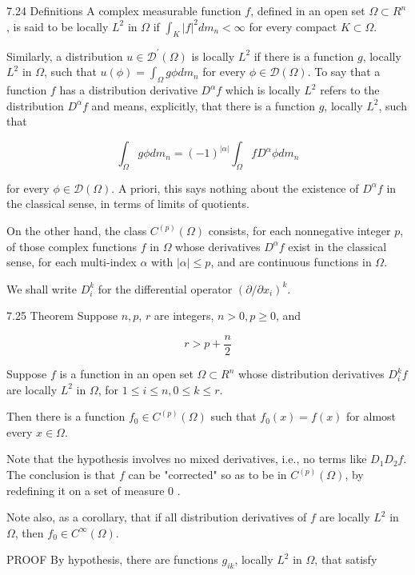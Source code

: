 \documentclass[10pt]{article}
\begin{document}
7.24 Definitions A complex measurable function $f$, defined in an open set $\Omega \subset R^{n}$, is said to be locally $L^{2}$ in $\Omega$ if $\int_{K}|f|^{2} d m_{n}<\infty$ for every compact $K \subset \Omega$.

Similarly, a distribution $u \in \mathscr{D}^{\prime}(\Omega)$ is locally $L^{2}$ if there is a function $g$, locally $L^{2}$ in $\Omega$, such that $u(\phi)=\int_{\Omega} g \phi d m_{n}$ for every $\phi \in \mathscr{D}(\Omega)$. To say that a function $f$ has a distribution derivative $D^{\alpha} f$ which is locally $L^{2}$ refers to the distribution $D^{\alpha} f$ and means, explicitly, that there is a function $g$, locally $L^{2}$, such that

$$
\int_{\Omega} g \phi d m_{n}=(-1)^{|\alpha|} \int_{\Omega} f D^{\alpha} \phi d m_{n}
$$

for every $\phi \in \mathscr{D}(\Omega)$. A priori, this says nothing about the existence of $D^{\alpha} f$ in the classical sense, in terms of limits of quotients.

On the other hand, the class $C^{(p)}(\Omega)$ consists, for each nonnegative integer $p$, of those complex functions $f$ in $\Omega$ whose derivatives $D^{\alpha} f$ exist in the classical sense, for each multi-index $\alpha$ with $|\alpha| \leq p$, and are continuous functions in $\Omega$.

We shall write $D_{i}^{k}$ for the differential operator $\left(\partial / \partial x_{i}\right)^{k}$.

7.25 Theorem Suppose $n, p$, $r$ are integers, $n>0, p \geq 0$, and

$$
r>p+\frac{n}{2}
$$

Suppose $f$ is a function in an open set $\Omega \subset R^{n}$ whose distribution derivatives $D_{i}^{k} f$ are locally $L^{2}$ in $\Omega$, for $1 \leq i \leq n, 0 \leq k \leq r$.

Then there is a function $f_{0} \in C^{(p)}(\Omega)$ such that $f_{0}(x)=f(x)$ for almost every $x \in \Omega$.

Note that the hypothesis involves no mixed derivatives, i.e., no terms like $D_{1} D_{2} f$. The conclusion is that $f$ can be "corrected" so as to be in $C^{(p)}(\Omega)$, by redefining it on a set of measure 0 .

Note also, as a corollary, that if all distribution derivatives of $f$ are locally $L^{2}$ in $\Omega$, then $f_{0} \in C^{\infty}(\Omega)$.

PROOF By hypothesis, there are functions $g_{i k}$, locally $L^{2}$ in $\Omega$, that satisfy
\end{document}
